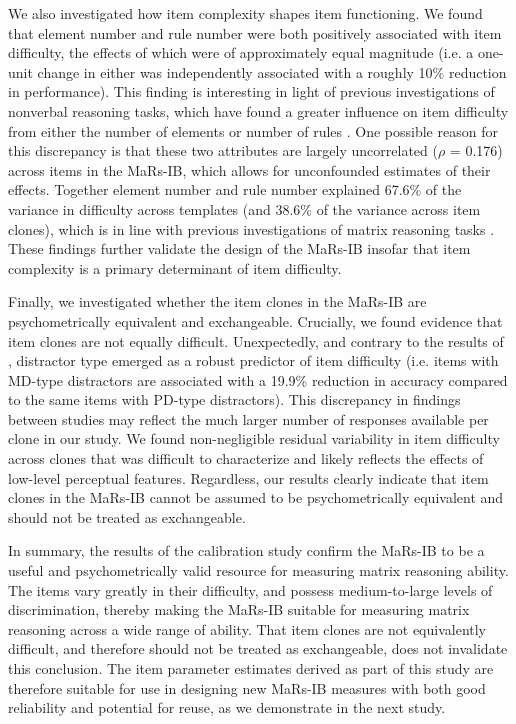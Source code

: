 \documentclass[a4paper,man,natbib]{apa6}
\begin{document}
We also investigated how item complexity shapes item functioning. We found that element number and rule number were both positively associated with item difficulty, the effects of which were of approximately equal magnitude (i.e. a one-unit change in either was independently associated with a roughly 10\% reduction in performance). This finding is interesting in light of previous investigations of nonverbal reasoning tasks, which have found a greater influence on item difficulty from either the number of elements \citep{bethell1984adaptive} or number of rules \citep{mulholland1980components}. One possible reason for this discrepancy is that these two attributes are largely uncorrelated ($\rho$ = 0.176) across items in the MaRs-IB, which allows for unconfounded estimates of their effects. Together element number and rule number explained 67.6\% of the variance in difficulty across templates (and 38.6\% of the variance across item clones), which is in line with previous investigations of matrix reasoning tasks \citep{carpenter1990one, matzen1994error}. These findings further validate the design of the MaRs-IB insofar that item complexity is a primary determinant of item difficulty.

Finally, we investigated whether the item clones in the MaRs-IB are psychometrically equivalent and exchangeable. Crucially, we found evidence that item clones are not equally difficult. Unexpectedly, and contrary to the results of \cite{chierchia2019matrix}, distractor type emerged as a robust predictor of item difficulty (i.e. items with MD-type distractors are associated with a 19.9\% reduction in accuracy compared to the same items with PD-type distractors). This discrepancy in findings between studies may reflect the much larger number of responses available per clone in our study. We found non-negligible residual variability in item difficulty across clones that was difficult to characterize and likely reflects the effects of low-level perceptual features. Regardless, our results clearly indicate that item clones in the MaRs-IB cannot be assumed to be psychometrically equivalent and should not be treated as exchangeable. 

In summary, the results of the calibration study confirm the MaRs-IB to be a useful and psychometrically valid resource for measuring matrix reasoning ability. The items vary greatly in their difficulty, and possess medium-to-large levels of discrimination, thereby making the MaRs-IB suitable for measuring matrix reasoning across a wide range of ability. That item clones are not equivalently difficult, and therefore should not be treated as exchangeable, does not invalidate this conclusion. The item parameter estimates derived as part of this study are therefore suitable for use in designing new MaRs-IB measures with both good reliability and potential for reuse, as we demonstrate in the next study. 
\end{document}
